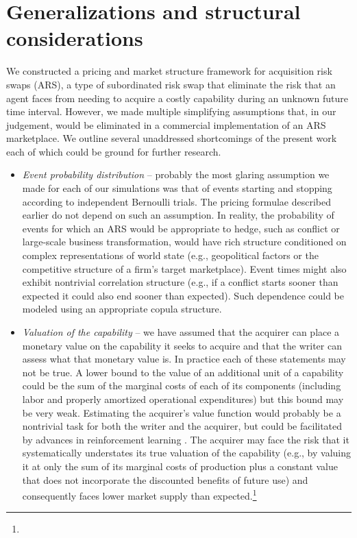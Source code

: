 \documentclass{article}
\begin{document}
\section{Generalizations and structural considerations}\label{sec:generalization}
We constructed a pricing and market structure framework for acquisition risk swaps (ARS), a type of subordinated risk swap that eliminate the risk that an agent faces from needing to acquire a costly capability during an unknown future time interval.
However, we made multiple simplifying assumptions that, in our judgement, would be eliminated in a commercial implementation of an ARS marketplace. 
We outline several unaddressed shortcomings of the present work each of which could be ground for further research.
\begin{itemize}
    \item \textit{Event probability distribution} -- probably the most glaring assumption we made for each of our simulations was that of events starting and stopping according to independent Bernoulli trials.
    The pricing formulae described earlier do not depend on such an assumption.
    In reality, the probability of events for which an ARS would be appropriate to hedge, such as conflict or large-scale business transformation, would have rich structure conditioned on complex representations of world state (e.g., geopolitical factors or the competitive structure of a firm's target marketplace).
    Event times might also exhibit nontrivial correlation structure (e.g., if a conflict starts sooner than expected it could also end sooner than expected).
    Such dependence could be modeled using an appropriate copula structure.
    \item \textit{Valuation of the capability} -- we have assumed that the acquirer can place a monetary value on the capability it seeks to acquire and that the writer can assess what that monetary value is.
    In practice each of these statements may not be true.
    A lower bound to the value of an additional unit of a capability could be the sum of the marginal costs of each of its components (including labor and properly amortized operational expenditures) but this bound may be very weak.
    Estimating the acquirer's value function would probably be a nontrivial task for both the writer and the acquirer, but could be facilitated by advances in reinforcement learning \cite{schaul2015universal}. The acquirer may face the risk that it systematically understates its true valuation of the capability (e.g., by valuing it at only the sum of its marginal costs of production plus a constant value that does not incorporate the discounted benefits of future use) and consequently faces lower market supply than expected.\footnote{
}
\end{itemize}
\end{document}
